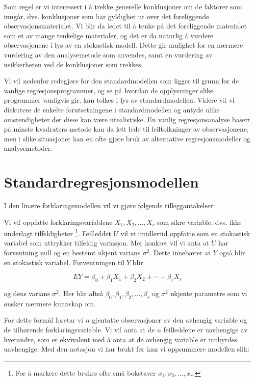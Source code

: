 Som regel er vi interessert i å trekke generelle konklusjoner om de
faktorer som inngår, dvs. konklusjoner som har gyldighet ut over det
foreliggende observasjonsmaterialet.  Vi blir da ledet til å tenke på
det foreliggende materialet som et av mange tenkelige materialer, og det er
da naturlig å vurdere observasjonene i lys av en stokastisk modell.  
Dette gir mulighet for en nærmere vurdering av den analysemetode som 
anvendes, samt en vurdering av usikkerheten ved de konklusjoner som trekkes.

Vi vil nedenfor redegjøre for den standardmodellen som ligger til grunn
for de vanlige regresjonsprogrammer, og se på hvordan de opplysninger
slike programmer vanligvis gir, kan tolkes i lys av standardmodellen.  
Videre vil vi diskutere de enkelte forutsetningene i standardmodellen og
antyde ulike omstendigheter der disse kan være urealistiske.  En vanlig
regresjonsanalyse basert på minste kvadraters metode kan da lett lede
til feiltolkninger av observasjonene, men i slike situasjoner kan en ofte
gjøre bruk av alternative regresjonsmodeller og analysemetoder.  


\section {Standardregresjonsmodellen}

I den linære forklaringsmodellen vil vi gjøre følgende 
tilleggantakelser:

Vi vil oppfatte forklaringsvariablene $X_1, X_2,\ldots , X_r$ som sikre
variable, dvs. ikke underlagt tilfeldigheter
\footnote {For å markere dette
brukes ofte små bokstaver $x_1, x_2, \ldots, x_r$.}.  Feilleddet $U$ vil
vi imidlertid oppfatte som en stokastisk variabel som uttrykker tilfeldig
variasjon.  Mer konkret vil vi anta at $U$ har forventning null og en
bestemt ukjent varians ${\sigma}^2$.  Dette innebærer at $Y$ også blir en
stokastisk variabel.  Forventningen til $Y$ blir

\[  EY= {\beta}_0 + {\beta}_1X_1 + {\beta}_2X_2 + \cdots + {\beta}_rX_r \]

\noindent og dens varians ${\sigma}^2$.
 Her blir altså ${\beta}_0, {\beta}_1, {\beta}_2,\ldots, {\beta}_r $
og ${\sigma}^2$ ukjente parametre som vi ønsker nærmere kunnskap om.

For dette formål foretar vi $n$ gjentatte observasjoner av den avhengig
variable og de tilhørende forklaringsvariable.  Vi vil anta at de $n$
feilleddene er uavhengige av hverandre, som er ekvivalent med å anta
at de avhengig variable er innbyrdes uavhengige.  Med den notasjon vi har brukt før kan vi oppsummere modellen slik:

